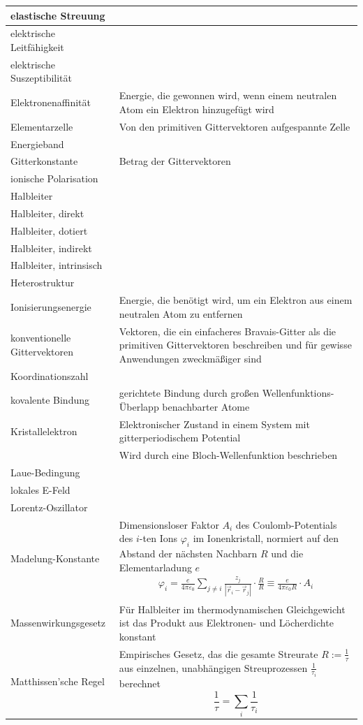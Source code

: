 \documentclass{article}
\begin{document}
\begin{xltabular}{\linewidth}{p{6cm}|X}
	\hline
		elastische Streuung &  \\
	\hline
		elektrische Leitfähigkeit &  \\
	\hline
		elektrische Suszeptibilität &  \\
	\hline
		Elektronenaffinität & Energie, die gewonnen wird, wenn einem neutralen Atom ein Elektron hinzugefügt wird \\
	\hline
		Elementarzelle & Von den primitiven Gittervektoren aufgespannte Zelle \\
	\hline
		Energieband &  \\
	\hline
		Gitterkonstante & Betrag der Gittervektoren \\
	\hline
		ionische Polarisation &  \\
	\hline
		Halbleiter &  \\
	\hline
		Halbleiter, direkt &  \\
	\hline
		Halbleiter, dotiert &  \\
	\hline
		Halbleiter, indirekt &  \\
	\hline
		Halbleiter, intrinsisch &  \\
	
	\hline
		Heterostruktur &  \\
	\hline
		Ionisierungsenergie & Energie, die benötigt wird, um ein Elektron aus einem neutralen Atom zu entfernen \\
	\hline
		konventionelle Gittervektoren & Vektoren, die ein einfacheres Bravais-Gitter als die primitiven Gittervektoren beschreiben und für gewisse Anwendungen zweckmäßiger sind \\
	\hline
		Koordinationszahl &  \\
	\hline
		kovalente Bindung & gerichtete Bindung durch großen Wellenfunktions-Überlapp benachbarter Atome \\
	\hline
		Kristallelektron & Elektronischer Zustand in einem System mit gitterperiodischem Potential\\
		 & Wird durch eine Bloch-Wellenfunktion beschrieben \\
	\hline
		Laue-Bedingung &  \\
	\hline
		lokales E-Feld &  \\
	\hline
		Lorentz-Oszillator &  \\
	\hline
		Madelung-Konstante & Dimensionsloser Faktor $A_i$ des Coulomb-Potentials des $i$-ten Ions $\varphi_i$ im Ionenkristall, normiert auf den Abstand der nächsten Nachbarn $R$ und die Elementarladung $e$
			{
			\begin{align*}
				\varphi_i = \frac{e}{4\pi\varepsilon_0} \sum_{j \neq i} \frac{z_j}{|\vec{r}_i - \vec{r}_j|} \cdot \frac{R}{R} \equiv \frac{e}{4\pi\varepsilon_0 R} \cdot A_i
			\end{align*}
			} 	\\
	\hline
		Massenwirkungsgesetz & Für Halbleiter im thermodynamischen Gleichgewicht ist das Produkt aus Elektronen- und Löcherdichte konstant \\
	\hline
		Matthissen'sche Regel & Empirisches Gesetz, das die gesamte Streurate $R := \frac{1}{\tau}$ aus einzelnen, unabhängigen Streuprozessen $\frac{1}{\tau_i}$ berechnet
			$$\frac{1}{\tau} = \sum_i \frac{1}{\tau_i}$$
		

\end{xltabular}
\end{document}
